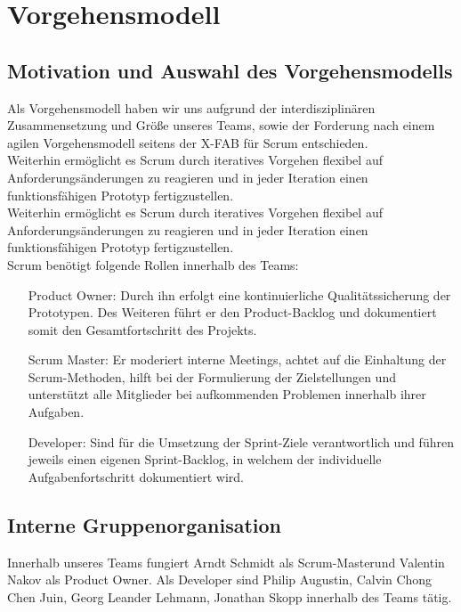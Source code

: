 \chapter{Vorgehensmodell}
\section{Motivation und Auswahl des Vorgehensmodells}

Als Vorgehensmodell haben wir uns aufgrund der interdisziplinären Zusammensetzung und Größe unseres Teams, sowie der Forderung nach einem agilen Vorgehensmodell seitens der X-FAB für Scrum entschieden.\\
Weiterhin ermöglicht es Scrum durch iteratives Vorgehen flexibel auf Anforderungsänderungen zu reagieren und in jeder Iteration einen funktionsfähigen Prototyp fertigzustellen.\\
Weiterhin ermöglicht es Scrum durch iteratives Vorgehen flexibel auf Anforderungsänderungen zu reagieren und in jeder Iteration einen funktionsfähigen Prototyp fertigzustellen.\\


Scrum benötigt folgende Rollen innerhalb des Teams:
\begin{itemize}
	\item[Product Owner:] Durch ihn erfolgt eine kontinuierliche Qualitätssicherung der Prototypen. Des Weiteren führt er den Product-Backlog und dokumentiert somit den Gesamtfortschritt des Projekts.

	\item[Scrum Master:] Er moderiert interne Meetings, achtet auf die Einhaltung der Scrum-Methoden, hilft bei der Formulierung der Zielstellungen und unterstützt alle Mitglieder bei aufkommenden Problemen innerhalb ihrer Aufgaben.
	
	\item[Developer:]
	Sind für die Umsetzung der Sprint-Ziele verantwortlich und führen jeweils einen eigenen Sprint-Backlog, in welchem der individuelle Aufgabenfortschritt dokumentiert wird.
	
\end{itemize}

\section{Interne Gruppenorganisation}
Innerhalb unseres Teams fungiert Arndt Schmidt als Scrum-Masterund Valentin Nakov als Product Owner. Als Developer sind Philip Augustin, Calvin Chong Chen Juin, Georg Leander Lehmann, Jonathan Skopp innerhalb des Teams tätig.\\

